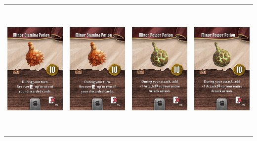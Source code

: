 \documentclass{minimal}
\begin{document}
{\begin{longtable}{llll}
\includegraphics[width=44mm,height=68mm]{./1-14/gh-013-minor-stamina-potion.png} &
\includegraphics[width=44mm,height=68mm]{./1-14/gh-013-minor-stamina-potion.png} &
\includegraphics[width=44mm,height=68mm]{./1-14/gh-014-minor-power-potion.png} &
\includegraphics[width=44mm,height=68mm]{./1-14/gh-014-minor-power-potion.png}\\ 

\end{longtable}}
\end{document}
